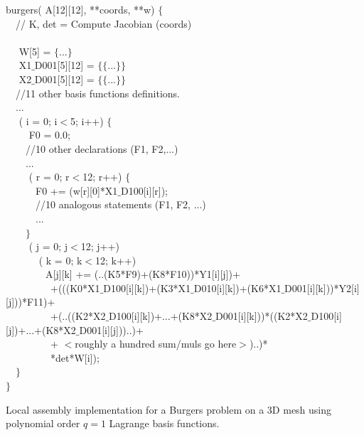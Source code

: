 \begin{algorithm}[t]
\scriptsize
{}

 burgers( A[12][12],  **coords,  **w) $\lbrace$\\
~~// K, det = Compute Jacobian (coords) \\
~~\\
~~ W[5] = $\lbrace$...$\rbrace$\\
~~ X1$\_$D001[5][12] = $\lbrace\lbrace$...$\rbrace\rbrace$\\
~~ X2$\_$D001[5][12] = $\lbrace\lbrace$...$\rbrace\rbrace$\\
~~//11 other basis functions definitions.\\
~~...\\
~~ ( i = 0; i$<$5; i++) $\lbrace$\\
~~~~ F0 = 0.0;\\
~~~~//10 other declarations (F1, F2,...)\\
~~~~...\\
~~~~ ( r = 0; r$<$12; r++) $\lbrace$\\
~~~~~~F0 += (w[r][0]*X1$\_$D100[i][r]);\\
~~~~~~//10 analogous statements (F1, F2, ...)\\
~~~~~~...\\
~~~~$\rbrace$\\
~~~~ ( j = 0; j$<$12; j++) \\
~~~~~~ ( k = 0; k$<$12; k++) \\
~~~~~~~~A[j][k] += (..(K5*F9)+(K8*F10))*Y1[i][j])+\\
~~~~~~~~~+(((K0*X1$\_$D100[i][k])+(K3*X1$\_$D010[i][k])+(K6*X1$\_$D001[i][k]))*Y2[i][j]))*F11)+\\
~~~~~~~~~+(..((K2*X2$\_$D100[i][k])+...+(K8*X2$\_$D001[i][k]))*((K2*X2$\_$D100[i][j])+...+(K8*X2$\_$D001[i][j]))..)+\\
~~~~~~~~~+ $<$roughly a hundred sum/muls go here$>$)..)*\\
~~~~~~~~~*det*W[i]);\\
~~$\rbrace$ \\
$\rbrace$
\caption{Local assembly implementation for a Burgers problem on a 3D mesh using polynomial order $q=1$ Lagrange basis functions.}
\label{code:burgers}
\end{algorithm}

